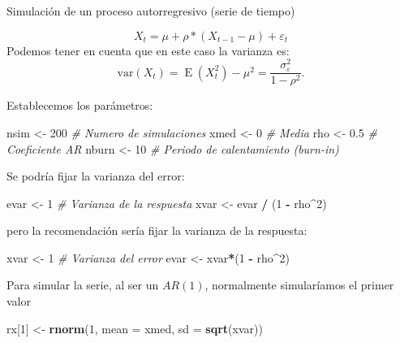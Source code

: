 \documentclass[
]{book}
\newenvironment{Shaded}{\begin{snugshade}}{\end{snugshade}}
\newcommand{\CommentTok}[1]{\textcolor[rgb]{0.56,0.35,0.01}{\textit{#1}}}
\newcommand{\DataTypeTok}[1]{\textcolor[rgb]{0.13,0.29,0.53}{#1}}
\newcommand{\DecValTok}[1]{\textcolor[rgb]{0.00,0.00,0.81}{#1}}
\newcommand{\FloatTok}[1]{\textcolor[rgb]{0.00,0.00,0.81}{#1}}
\newcommand{\KeywordTok}[1]{\textcolor[rgb]{0.13,0.29,0.53}{\textbf{#1}}}
\newcommand{\NormalTok}[1]{#1}
\newcommand{\OperatorTok}[1]{\textcolor[rgb]{0.81,0.36,0.00}{\textbf{#1}}}
\newcommand{\StringTok}[1]{\textcolor[rgb]{0.31,0.60,0.02}{#1}}
\theoremstyle{break}
\theoremstyle{definition}
\theoremstyle{definition}
\theoremstyle{definition}
\theoremstyle{remark}
\let\BeginKnitrBlock\begin \let\EndKnitrBlock\end
\begin{document}
\BeginKnitrBlock{example}
\protect\hypertarget{exm:unnamed-chunk-18}{}{\label{exm:unnamed-chunk-18} }Simulación de un proceso autorregresivo (serie de tiempo)
\EndKnitrBlock{example}

\[X_t = \mu + \rho * (X_{t-1} - \mu) + \varepsilon_t\]
Podemos tener en cuenta que en este caso la varianza es:
\[\textrm{var}(X_t)=\operatorname{E}(X_t^2)-\mu^2=\frac{\sigma_\varepsilon^2}{1-\rho^2}.\]

Establecemos los parámetros:

\begin{Shaded}
\begin{Highlighting}[]
\NormalTok{nsim <-}\StringTok{ }\DecValTok{200}   \CommentTok{# Numero de simulaciones}
\NormalTok{xmed <-}\StringTok{ }\DecValTok{0}     \CommentTok{# Media}
\NormalTok{rho <-}\StringTok{ }\FloatTok{0.5}    \CommentTok{# Coeficiente AR}
\NormalTok{nburn <-}\StringTok{ }\DecValTok{10}   \CommentTok{# Periodo de calentamiento (burn-in)}
\end{Highlighting}
\end{Shaded}

Se podría fijar la varianza del error:

\begin{Shaded}
\begin{Highlighting}[]
\NormalTok{evar <-}\StringTok{ }\DecValTok{1}
\CommentTok{# Varianza de la respuesta}
\NormalTok{xvar <-}\StringTok{ }\NormalTok{evar }\OperatorTok{/}\StringTok{ }\NormalTok{(}\DecValTok{1} \OperatorTok{-}\StringTok{ }\NormalTok{rho}\OperatorTok{^}\DecValTok{2}\NormalTok{)}
\end{Highlighting}
\end{Shaded}

pero la recomendación sería fijar la varianza de la respuesta:

\begin{Shaded}
\begin{Highlighting}[]
\NormalTok{xvar <-}\StringTok{ }\DecValTok{1}     
\CommentTok{# Varianza del error}
\NormalTok{evar <-}\StringTok{ }\NormalTok{xvar}\OperatorTok{*}\NormalTok{(}\DecValTok{1} \OperatorTok{-}\StringTok{ }\NormalTok{rho}\OperatorTok{^}\DecValTok{2}\NormalTok{)}
\end{Highlighting}
\end{Shaded}

Para simular la serie, al ser un \(AR(1)\), normalmente simularíamos el primer valor

\begin{Shaded}
\begin{Highlighting}[]
\NormalTok{rx[}\DecValTok{1}\NormalTok{] <-}\StringTok{ }\KeywordTok{rnorm}\NormalTok{(}\DecValTok{1}\NormalTok{, }\DataTypeTok{mean =}\NormalTok{ xmed, }\DataTypeTok{sd =} \KeywordTok{sqrt}\NormalTok{(xvar))}
\end{Highlighting}
\end{Shaded}
\end{document}
